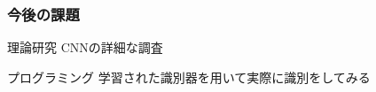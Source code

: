 \documentclass[dvipdfmx,11pt,notheorems]{beamer}
\theoremstyle{definition}
\newtheorem{theorem}{定理}
\begin{document}
\begin{frame}\frametitle{今後の課題}

\begin{block}{理論研究}
CNNの詳細な調査
\end{block}

\vspace{1cm}
\begin{exampleblock}{プログラミング}
学習された識別器を用いて実際に識別をしてみる
\end{exampleblock}
\end{frame}




\end{document}
